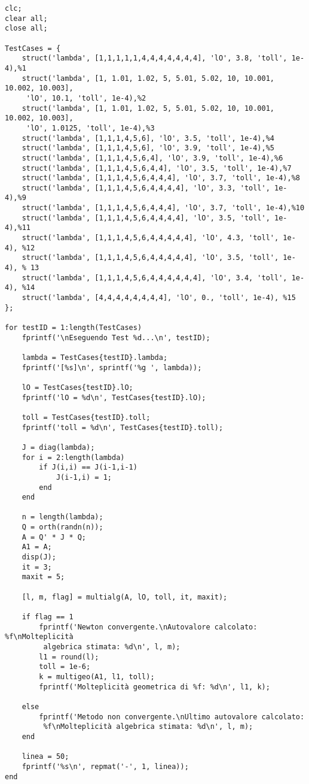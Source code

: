 \documentclass[12pt]{article}
\begin{document}
    \begin{verbatim}
clc;
clear all;
close all;
    
TestCases = {
    struct('lambda', [1,1,1,1,1,4,4,4,4,4,4,4], 'lO', 3.8, 'toll', 1e-4),%1
    struct('lambda', [1, 1.01, 1.02, 5, 5.01, 5.02, 10, 10.001, 10.002, 10.003],
     'lO', 10.1, 'toll', 1e-4),%2
    struct('lambda', [1, 1.01, 1.02, 5, 5.01, 5.02, 10, 10.001, 10.002, 10.003],
     'lO', 1.0125, 'toll', 1e-4),%3
    struct('lambda', [1,1,1,4,5,6], 'lO', 3.5, 'toll', 1e-4),%4 
    struct('lambda', [1,1,1,4,5,6], 'lO', 3.9, 'toll', 1e-4),%5
    struct('lambda', [1,1,1,4,5,6,4], 'lO', 3.9, 'toll', 1e-4),%6
    struct('lambda', [1,1,1,4,5,6,4,4], 'lO', 3.5, 'toll', 1e-4),%7
    struct('lambda', [1,1,1,4,5,6,4,4,4], 'lO', 3.7, 'toll', 1e-4),%8 
    struct('lambda', [1,1,1,4,5,6,4,4,4,4], 'lO', 3.3, 'toll', 1e-4),%9 
    struct('lambda', [1,1,1,4,5,6,4,4,4], 'lO', 3.7, 'toll', 1e-4),%10
    struct('lambda', [1,1,1,4,5,6,4,4,4,4], 'lO', 3.5, 'toll', 1e-4),%11
    struct('lambda', [1,1,1,4,5,6,4,4,4,4,4], 'lO', 4.3, 'toll', 1e-4), %12
    struct('lambda', [1,1,1,4,5,6,4,4,4,4,4], 'lO', 3.5, 'toll', 1e-4), % 13
    struct('lambda', [1,1,1,4,5,6,4,4,4,4,4,4], 'lO', 3.4, 'toll', 1e-4), %14
    struct('lambda', [4,4,4,4,4,4,4,4], 'lO', 0., 'toll', 1e-4), %15
};

for testID = 1:length(TestCases)
    fprintf('\nEseguendo Test %d...\n', testID);
    
    lambda = TestCases{testID}.lambda;
    fprintf('[%s]\n', sprintf('%g ', lambda));

    lO = TestCases{testID}.lO;
    fprintf('lO = %d\n', TestCases{testID}.lO);

    toll = TestCases{testID}.toll;
    fprintf('toll = %d\n', TestCases{testID}.toll);

    J = diag(lambda);
    for i = 2:length(lambda)
        if J(i,i) == J(i-1,i-1)
            J(i-1,i) = 1;
        end
    end
    
    n = length(lambda);
    Q = orth(randn(n));
    A = Q' * J * Q;
    A1 = A;
    disp(J);
    it = 3;
    maxit = 5;
    
    [l, m, flag] = multialg(A, lO, toll, it, maxit);
    
    if flag == 1
        fprintf('Newton convergente.\nAutovalore calcolato: %f\nMolteplicità 
         algebrica stimata: %d\n', l, m);
        l1 = round(l);
        toll = 1e-6;
        k = multigeo(A1, l1, toll);
        fprintf('Molteplicità geometrica di %f: %d\n', l1, k);

    else
        fprintf('Metodo non convergente.\nUltimo autovalore calcolato:
         %f\nMolteplicità algebrica stimata: %d\n', l, m);
    end
    
    linea = 50;
    fprintf('%s\n', repmat('-', 1, linea));
end
    \end{verbatim}
\end{document}
